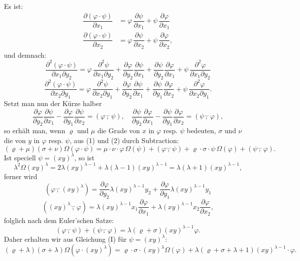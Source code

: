 \documentclass[11pt]{article}
\providecommand{\weq}[2]{\begin{equation}\tag{#1}#2\end{equation}}
\let\Omega\varOmega
\begin{document}
Es ist:
\[ \begin{aligned} \dfrac{\partial(\varphi\cdot\psi)}{\partial x_1} &= \varphi\,\dfrac{\partial\psi}{\partial x_1} + \psi\,\dfrac{\partial\varphi}{\partial x_1} \\ \dfrac{\partial(\varphi\cdot\psi)}{\partial x_2} &= \varphi\,\dfrac{\partial\psi}{\partial x_2} + \psi\,\dfrac{\partial\varphi}{\partial x_2}, \end{aligned} \]
und demnach:
\weq{1}{\dfrac{\partial^2(\varphi\cdot\psi)}{\partial x_1\partial y_2} = \varphi\,\dfrac{\partial^2\psi}{\partial x_1\partial y_2} + \dfrac{\partial\varphi}{\partial y_2}\dfrac{\partial\psi}{\partial x_1} + \dfrac{\partial\psi}{\partial y_2}\dfrac{\partial\varphi}{\partial x_1} + \psi\,\dfrac{\partial^2\varphi}{\partial x_1\partial y_2}}
\weq{2}{\dfrac{\partial^2(\varphi\cdot\psi)}{\partial x_2\partial y_1} = \varphi\,\dfrac{\partial^2\psi}{\partial x_2\partial y_1} + \dfrac{\partial\varphi}{\partial y_2}\dfrac{\partial\psi}{\partial x_1} + \dfrac{\partial\psi}{\partial y_1}\dfrac{\partial\varphi}{\partial x_2} + \psi\,\dfrac{\partial^2\varphi}{\partial x_2\partial y_1}.}
Setzt man nun der Kürze halber
\[ \dfrac{\partial\varphi}{\partial y_2}\dfrac{\partial\psi}{\partial x_1} - \dfrac{\partial\varphi}{\partial y_1}\dfrac{\partial\psi}{\partial x_2} = (\varphi\overset{\smile}{,}\psi), \quad \dfrac{\partial\psi}{\partial y_2}\dfrac{\partial\varphi}{\partial x_1} - \dfrac{\partial\psi}{\partial y_1}\dfrac{\partial\varphi}{\partial x_2} = (\psi\overset{\smile}{,}\varphi), \]
so erhält man, wenn $\varrho$ und $\mu$ die Grade von $x$ in $\varphi$ resp. $\psi$ bedeuten, $\sigma$ und $\nu$ die von $y$ in $\varphi$ resp. $\psi$, aus (1) und (2) durch Subtraction:
\weq{I}{(\varrho+\mu)(\sigma+\nu)\Omega(\varphi\cdot\psi) = \mu\cdot\nu\cdot\varphi\,\Omega(\psi) + (\varphi\overset{\smile}{,}\psi) + \varrho\cdot\sigma\cdot\psi\,\Omega(\varphi) + (\psi\overset{\smile}{,}\varphi).}
Ist speciell $\psi = (xy)^\lambda$, so ist
\[ \lambda^2\Omega(xy)^\lambda = 2\lambda(xy)^{\lambda-1} + \lambda(\lambda-1)(xy)^{\lambda-1} = \lambda(\lambda+1)(xy)^{\lambda-1}, \]
ferner wird
\[ (\varphi\overset{\smile}{,}(xy)^\lambda) = \dfrac{\partial\varphi}{\partial y_2}\lambda(xy)^{\lambda-1}y_2 + \dfrac{\partial\varphi}{\partial y_1}\lambda(xy)^{\lambda-1}y_1 \]
\[ ((xy)^\lambda\overset{\smile}{,}\varphi) = \lambda(xy)^{\lambda-1}x_1\dfrac{\partial\varphi}{\partial x_1} + \lambda(xy)^{\lambda-1}x_2\dfrac{\partial\varphi}{\partial x_2}, \]
folglich nach dem Euler'schen Satze:
\[ (\varphi\overset{\smile}{,}\psi) + (\psi\overset{\smile}{,}\varphi) = \lambda(\varrho+\sigma)(xy)^{\lambda-1}\varphi. \]
Daher erhalten wir aus Gleichung (I) für $\psi = (xy)^\lambda$:
\weq{II}{(\varrho+\lambda)(\sigma+\lambda)\Omega(\varphi\cdot(xy)^\lambda) = \varrho\cdot\sigma\cdot(xy)^\lambda\Omega(\varphi) + \lambda(\varrho+\sigma+\lambda+1)(xy)^{\lambda-1}\cdot\varphi.}
\end{document}
